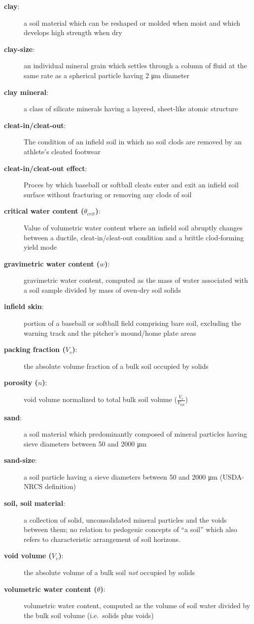 \documentclass[
  letterpaper,
  openany]{book}
\begin{document}
\begin{description}
\item[\textbf{clay}:]
a soil material which can be reshaped or molded when moist and which develops high strength when dry
\item[\textbf{clay-size}:]
an individual mineral grain which settles through a column of fluid at the same rate as a spherical particle having 2 μm diameter
\item[\textbf{clay mineral}:]
a class of silicate minerals having a layered, sheet-like atomic structure
\item[\textbf{cleat-in/cleat-out}:]
The condition of an infield soil in which no soil clods are removed by an athlete's cleated footwear
\item[\textbf{cleat-in/cleat-out effect}:]
Proces by which baseball or softball cleats enter and exit an infield soil surface without fracturing or removing any clods of soil
\item[\textbf{critical water content (\(\theta_{crit}\))}:]
Value of volumetric water content where an infield soil abruptly changes between a ductile, cleat-in/cleat-out condition and a brittle clod-forming yield mode
\item[\textbf{gravimetric water content (\(w\))}:]
gravimetric water content, computed as the mass of water associated with a soil sample divided by mass of oven-dry soil solids
\item[\textbf{infield skin}:]
portion of a baseball or softball field comprising bare soil, excluding the warning track and the pitcher's mound/home plate areas
\item[\textbf{packing fraction (\(V_{s}\))}:]
the absolute volume fraction of a bulk soil occupied by solids
\item[\textbf{porosity (\(n\))}:]
void volume normalized to total bulk soil volume (\(\frac{V_v}{V_{tot}}\))
\item[\textbf{sand}:]
a soil material which predominantly composed of mineral particles having sieve diameters between 50 and 2000 μm
\item[\textbf{sand-size}:]
a soil particle having a sieve diameters between 50 and 2000 μm (USDA-NRCS definition)
\item[\textbf{soil, soil material}:]
a collection of solid, unconsolidated mineral particles and the voids between them; no relation to pedogenic concepts of ``a soil'' which also refers to characteristic arrangement of soil horizons.
\item[\textbf{void volume (\(V_{v}\))}:]
the absolute volume of a bulk soil \emph{not} occupied by solids
\item[\textbf{volumetric water content (\(\theta\))}:]
volumetric water content, computed as the volume of soil water divided by the bulk soil volume (i.e.~solids plus voids)
\end{description}
\end{document}
